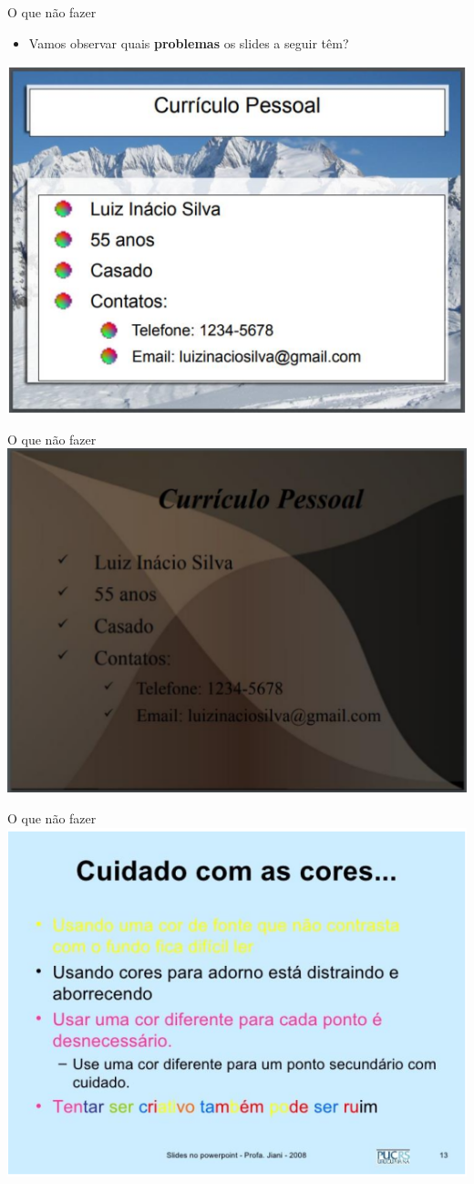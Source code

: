 \begin{frame}{O que não fazer}
	\begin{block}{}
		\begin{itemize}
			\item Vamos observar quais \textbf{problemas} os slides a seguir têm?
		\end{itemize}
	\end{block}

	\centering
	\includegraphics[width=0.7\linewidth]{Figuras/Ch05/fig17}
\end{frame}


\begin{frame}{O que não fazer}
	\centering
	\includegraphics[width=0.7\linewidth]{Figuras/Ch05/fig18}
\end{frame}


\begin{frame}{O que não fazer}
	\centering
	\includegraphics[width=0.7\linewidth]{Figuras/Ch05/fig19}
\end{frame}


